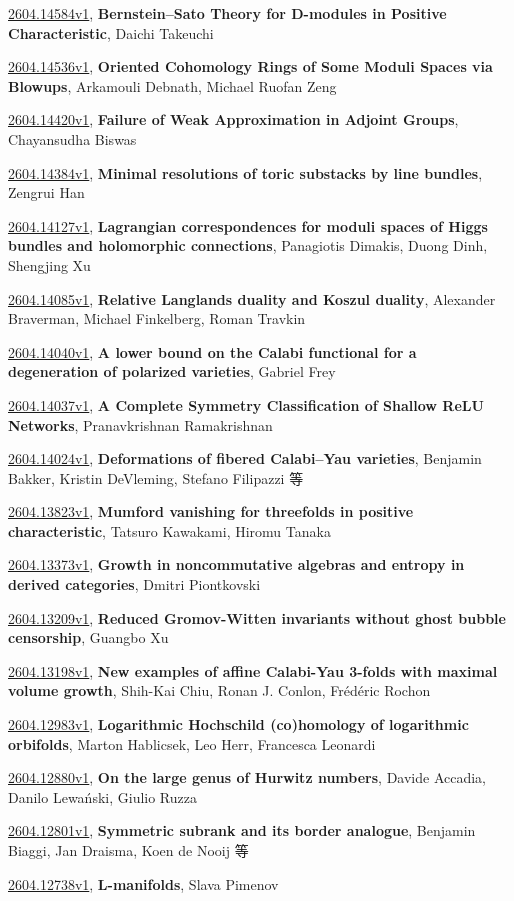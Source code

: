 \documentclass[9pt, a4paper]{article}
\theoremstyle{plain}
\theoremstyle{definition}
\theoremstyle{remark}
\newcommand{\arxiv}[3]{\href{https://arxiv.org/abs/#1}{#1}, \textbf{\textcolor{arxivblue}{#2}}, #3}
\begin{document}
\arxiv{2604.14584v1}{Bernstein--Sato Theory for D-modules in Positive Characteristic}{Daichi Takeuchi}

\arxiv{2604.14536v1}{Oriented Cohomology Rings of Some Moduli Spaces via Blowups}{Arkamouli Debnath, Michael Ruofan Zeng}

\arxiv{2604.14420v1}{Failure of Weak Approximation in Adjoint Groups}{Chayansudha Biswas}

\arxiv{2604.14384v1}{Minimal resolutions of toric substacks by line bundles}{Zengrui Han}

\arxiv{2604.14127v1}{Lagrangian correspondences for moduli spaces of Higgs bundles and holomorphic connections}{Panagiotis Dimakis, Duong Dinh, Shengjing Xu}

\arxiv{2604.14085v1}{Relative Langlands duality and Koszul duality}{Alexander Braverman, Michael Finkelberg, Roman Travkin}

\arxiv{2604.14040v1}{A lower bound on the Calabi functional for a degeneration of polarized varieties}{Gabriel Frey}

\arxiv{2604.14037v1}{A Complete Symmetry Classification of Shallow ReLU Networks}{Pranavkrishnan Ramakrishnan}

\arxiv{2604.14024v1}{Deformations of fibered Calabi--Yau varieties}{Benjamin Bakker, Kristin DeVleming, Stefano Filipazzi 等}

\arxiv{2604.13823v1}{Mumford vanishing for threefolds in positive characteristic}{Tatsuro Kawakami, Hiromu Tanaka}

\arxiv{2604.13373v1}{Growth in noncommutative algebras and entropy in derived categories}{Dmitri Piontkovski}

\arxiv{2604.13209v1}{Reduced Gromov-Witten invariants without ghost bubble censorship}{Guangbo Xu}

\arxiv{2604.13198v1}{New examples of affine Calabi-Yau 3-folds with maximal volume growth}{Shih-Kai Chiu, Ronan J. Conlon, Frédéric Rochon}

\arxiv{2604.12983v1}{Logarithmic Hochschild (co)homology of logarithmic orbifolds}{Marton Hablicsek, Leo Herr, Francesca Leonardi}

\arxiv{2604.12880v1}{On the large genus of Hurwitz numbers}{Davide Accadia, Danilo Lewański, Giulio Ruzza}

\arxiv{2604.12801v1}{Symmetric subrank and its border analogue}{Benjamin Biaggi, Jan Draisma, Koen de Nooij 等}

\arxiv{2604.12738v1}{L-manifolds}{Slava Pimenov}
\end{document}
